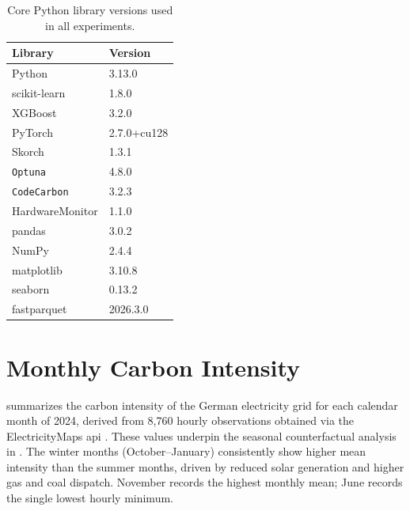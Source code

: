 \begin{table}[htbp]
\centering
\caption{Core Python library versions used in all experiments.}
\label{tab:app_software}
\begin{tabular}{ll}
\toprule
\textbf{Library} & \textbf{Version} \\
\midrule
Python           & 3.13.0 \\
scikit-learn     & 1.8.0 \\
XGBoost          & 3.2.0 \\
PyTorch          & 2.7.0+cu128 \\
Skorch           & 1.3.1 \\
\texttt{Optuna}           & 4.8.0 \\
\texttt{CodeCarbon}       & 3.2.3 \\
HardwareMonitor  & 1.1.0 \\
pandas           & 3.0.2 \\
NumPy            & 2.4.4 \\
matplotlib       & 3.10.8 \\
seaborn          & 0.13.2 \\
fastparquet      & 2026.3.0 \\
\bottomrule
\end{tabular}
\end{table}


\chapter{Monthly Carbon Intensity}
\label{app:carbon_monthly}

 summarizes the carbon intensity of the German electricity grid for each calendar month of 2024, derived from 8{,}760 hourly observations obtained via the ElectricityMaps \gls{api} \cite{electricityMapsAPI2025}. These values underpin the seasonal counterfactual analysis in . The winter months (October--January) consistently show higher mean intensity than the summer months, driven by reduced solar generation and higher gas and coal dispatch. November records the highest monthly mean; June records the single lowest hourly minimum.

